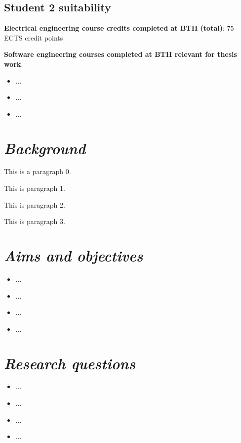 \documentclass[10pt,english,a4paper]{article}
\newcommand{\sunnyLine}{\vspace{16pt}}
\begin{document}
\subsection*{Student 2 suitability}
\noindent\textbf{Electrical engineering course credits completed at BTH (total)}: 75 ECTS credit points
\sunnyLine{}

\noindent\textbf{Software engineering courses completed at BTH relevant for thesis work}:
\begin{itemize}
\item{...}
\item{...}
\item{...}
\end{itemize}


\section{\large\textit{Background}}
This is a paragraph 0.

This is paragraph 1.

This is paragraph 2.

This is paragraph 3.


\section{\large\textit{Aims and objectives}}

\begin{itemize}
\item{...}
\item{...}
\item{...}
\item{...}
\end{itemize}


\section{\large\textit{Research questions}}
\begin{itemize}
\item{...}
\item{...}
\item{...}
\item{...}
\end{itemize}
\end{document}
